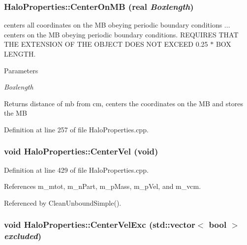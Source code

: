 \subsubsection[{CenterOnMB}]{ HaloProperties::CenterOnMB ({\bf real} {\em Boxlength})}\label{classHaloProperties_a93804911ced0f2b51e08626f8b4f914a}
centers all coordinates on the MB obeying periodic boundary conditions ... centers on the MB obeying periodic boundary conditions. REQUIRES THAT THE EXTENSION OF THE OBJECT DOES NOT EXCEED 0.25 $\ast$ BOX LENGTH. 
\begin{DoxyParams}{Parameters}
\item[{\em Boxlength}]\end{DoxyParams}
\begin{DoxyReturn}{Returns}
distance of mb from cm, centers the coordinates on the MB and stores the MB 
\end{DoxyReturn}


Definition at line 257 of file HaloProperties.cpp.

\subsubsection[{CenterVel}]{\setlength{\rightskip}{0pt plus 5cm}void HaloProperties::CenterVel (void)}\label{classHaloProperties_ab8ca12ff57d1ed55feedb3a287136745}


Definition at line 429 of file HaloProperties.cpp.



References m\_\-mtot, m\_\-nPart, m\_\-pMass, m\_\-pVel, and m\_\-vcm.



Referenced by CleanUnboundSimple().

\subsubsection[{CenterVelExc}]{\setlength{\rightskip}{0pt plus 5cm}void HaloProperties::CenterVelExc (std::vector$<$ bool $>$ {\em excluded})}\label{classHaloProperties_ab5b9df653b5053ef445381c38bd1940c}


